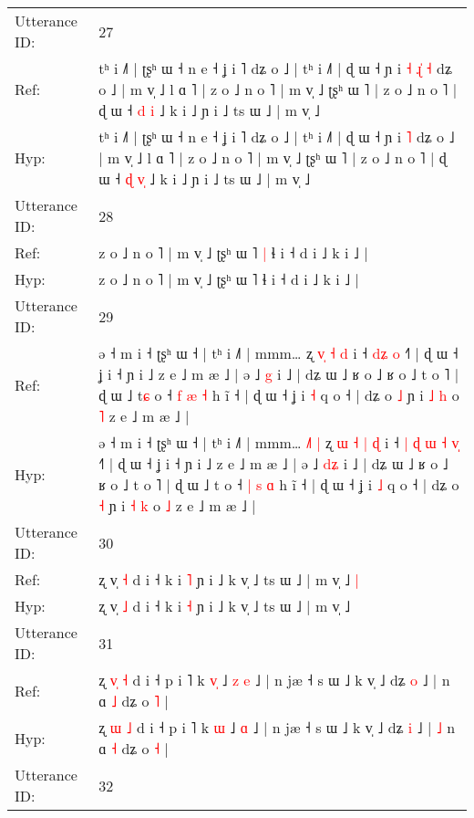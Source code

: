 \documentclass[10pt]{article}
\DeclareRobustCommand{\hl}[1]{{\textcolor{red}{#1}}}
\begin{document}
\begin{longtable}{ll}
\midrule
Utterance ID: & 27 \\
Ref: & tʰ i ˩˥ | ʈʂʰ ɯ ˧ n e ˧ ʝ i ˥ dʑ o ˩ | tʰ i ˩˥ | ɖ ɯ ˧ ɲ i\hl{ }\hl{˧}\hl{ }\hl{ɻ}\hl{̍} \hl{˧} dʑ o ˩ | m v̩ ˩ l ɑ ˥ | z o ˩ n o ˥ | m v̩ ˩ ʈʂʰ ɯ ˥ | z o ˩ n o ˥ | ɖ ɯ ˧ \hl{d} \hl{}\hl{i} ˩ k i ˩ ɲ i ˩ ts ɯ ˩ | m v̩ ˩
 \\
Hyp: & tʰ i ˩˥ | ʈʂʰ ɯ ˧ n e ˧ ʝ i ˥ dʑ o ˩ | tʰ i ˩˥ | ɖ ɯ ˧ ɲ i\hl{}\hl{}\hl{}\hl{}\hl{} \hl{˥} dʑ o ˩ | m v̩ ˩ l ɑ ˥ | z o ˩ n o ˥ | m v̩ ˩ ʈʂʰ ɯ ˥ | z o ˩ n o ˥ | ɖ ɯ ˧ \hl{ɖ} \hl{v}\hl{̩} ˩ k i ˩ ɲ i ˩ ts ɯ ˩ | m v̩ ˩
 \\
\midrule
Utterance ID: & 28 \\
Ref: & z o ˩ n o ˥ | m v̩ ˩ ʈʂʰ ɯ ˥\hl{ }\hl{|} ɬ i ˧ d i ˩ k i ˩ |
 \\
Hyp: & z o ˩ n o ˥ | m v̩ ˩ ʈʂʰ ɯ ˥\hl{}\hl{} ɬ i ˧ d i ˩ k i ˩ |
 \\
\midrule
Utterance ID: & 29 \\
Ref: & ə ˧ m i ˧ ʈʂʰ ɯ ˧ | tʰ i ˩˥ | mmm…\hl{}\hl{}\hl{}\hl{}\hl{} ʐ \hl{}\hl{v}\hl{̩} \hl{˧} \hl{d} i ˧\hl{}\hl{}\hl{}\hl{} \hl{}\hl{d}\hl{ʑ} \hl{}\hl{o} ˧˥ | ɖ ɯ ˧ ʝ i ˧ ɲ i ˩ z e ˩ m æ ˩ | ə ˩ \hl{}\hl{g} i ˩ | dʑ ɯ ˩ ʁ o ˩ ʁ o ˩ t o ˥ | ɖ ɯ ˩ t\hl{ɕ} o ˧ \hl{f} \hl{æ} \hl{˧} h ĩ ˧ | ɖ ɯ ˧ ʝ i \hl{˧} q o ˧ | dʑ o \hl{˩} ɲ i \hl{˩} \hl{h} o \hl{˥} z e ˩ m æ ˩ |
 \\
Hyp: & ə ˧ m i ˧ ʈʂʰ ɯ ˧ | tʰ i ˩˥ | mmm…\hl{ }\hl{˩}\hl{˥}\hl{ }\hl{|} ʐ \hl{ɯ}\hl{ }\hl{˧} \hl{|} \hl{ɖ} i ˧\hl{ }\hl{|}\hl{ }\hl{ɖ} \hl{ɯ}\hl{ }\hl{˧} \hl{v}\hl{̩} ˧˥ | ɖ ɯ ˧ ʝ i ˧ ɲ i ˩ z e ˩ m æ ˩ | ə ˩ \hl{d}\hl{ʑ} i ˩ | dʑ ɯ ˩ ʁ o ˩ ʁ o ˩ t o ˥ | ɖ ɯ ˩ t\hl{} o ˧ \hl{|} \hl{s} \hl{ɑ} h ĩ ˧ | ɖ ɯ ˧ ʝ i \hl{˩} q o ˧ | dʑ o \hl{˧} ɲ i \hl{˧} \hl{k} o \hl{˩} z e ˩ m æ ˩ |
 \\
\midrule
Utterance ID: & 30 \\
Ref: & ʐ v̩ \hl{˧} d i ˧ k i \hl{˥} ɲ i ˩ k v̩ ˩ ts ɯ ˩ | m v̩ ˩\hl{ }\hl{|}
 \\
Hyp: & ʐ v̩ \hl{˩} d i ˧ k i \hl{˧} ɲ i ˩ k v̩ ˩ ts ɯ ˩ | m v̩ ˩\hl{}\hl{}
 \\
\midrule
Utterance ID: & 31 \\
Ref: & ʐ \hl{v}\hl{̩} \hl{˧} d i ˧ p i ˥ k \hl{v}\hl{̩} ˩\hl{ }\hl{z} \hl{e} ˩ | n jæ ˧ s ɯ ˩ k v̩ ˩ dʑ \hl{o} ˩ |\hl{}\hl{} n ɑ \hl{˩} dʑ o \hl{˥} |
 \\
Hyp: & ʐ \hl{}\hl{ɯ} \hl{˩} d i ˧ p i ˥ k \hl{}\hl{ɯ} ˩\hl{}\hl{} \hl{ɑ} ˩ | n jæ ˧ s ɯ ˩ k v̩ ˩ dʑ \hl{i} ˩ |\hl{ }\hl{˩} n ɑ \hl{˧} dʑ o \hl{˧} |
 \\
\midrule
Utterance ID: & 32 \\

\end{longtable}
\end{document}
